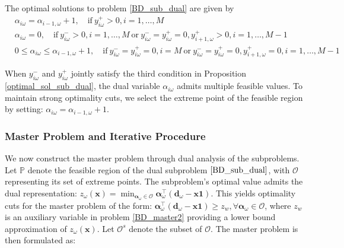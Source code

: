  \begin{prop}\label{optimal_sol_sub_dual}
   The optimal solutions to problem \eqref{BD_sub_dual} are given by 
 \begin{equation}\label{BD_sub_simplified}
   \begin{aligned}
    & \alpha_{i \omega} = \alpha_{i-1, \omega}+1, \quad  \text{if}~ y_{i \omega}^{+} > 0, i =1,\ldots, M \\
     & \alpha_{i \omega} = 0, \quad  \text{if}~  y_{i \omega}^{-} > 0,  i =1,\ldots, M~\text{or}~ y_{i \omega}^{-} = y_{i \omega}^{+} = 0, y_{i+1, \omega}^{+}> 0, i = 1,\ldots, M-1 \\
     & 0 \leq \alpha_{i \omega} \leq \alpha_{i-1, \omega}+1, \quad  \text{if}~ y_{i \omega}^{-} = y_{i \omega}^{+} = 0, i = M~\text{or}~ y_{i \omega}^{-} = y_{i \omega}^{+} = 0, y_{i+1, \omega}^{+}= 0, i = 1,\ldots, M-1
   \end{aligned}
 \end{equation}
 \end{prop}


When $y_{i \omega}^{-}$ and $y_{i \omega}^{+}$ jointly satisfy the third condition in Proposition \ref{optimal_sol_sub_dual}, the dual variable $\alpha_{i \omega}$ admits multiple feasible values. To maintain strong optimality cuts, we select the extreme point of the feasible region by setting: $\alpha_{i \omega} = \alpha_{i-1, \omega}+1$.



\subsubsection{Master Problem and Iterative Procedure}
We now construct the master problem through dual analysis of the subproblems. Let $\mathbb{P}$ denote the feasible region of the dual subproblem $\eqref{BD_sub_dual}$, with $\mathcal{O}$ representing its set of extreme points. The subproblem's optimal value admits the dual representation: $z_{\omega}(\mathbf{x}) = \min_{\bm{\alpha}_{\omega} \in \mathcal{O}} \bm{\alpha}_{\omega}^{\intercal}(\mathbf{d}_{\omega}- \mathbf{x} \mathbf{1})$. This yields optimality cuts for the master problem of the form: $\bm{\alpha}_{\omega}^{\intercal}(\mathbf{d}_{\omega}- \mathbf{x} \mathbf{1}) \geq z_w, \forall \bm{\alpha}_{\omega} \in \mathcal{O}$, where $z_w$ is an auxiliary variable in problem \eqref{BD_master2} providing a lower bound approximation of $z_{\omega}(\mathbf{x})$. Let $\mathcal{O}^{s}$ denote the subset of $\mathcal{O}$. The master problem is then formulated as:

